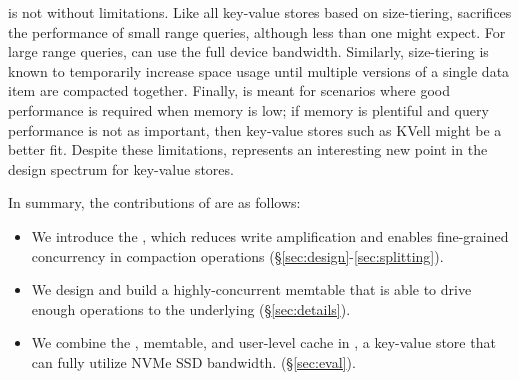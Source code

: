 %

\sysname is not without limitations. Like all key-value stores based
on size-tiering, \sysname sacrifices the performance of small range
queries, although less than one might expect.  For large range
queries, \sysname can use the full device bandwidth. Similarly,
size-tiering is known to temporarily increase space usage until
multiple versions of a single data item are compacted
together. Finally, \sysname is meant for scenarios where good
performance is required when memory is low; if memory is plentiful
and query performance is not as important,
then key-value stores such as KVell might be a better fit. Despite
these limitations, \sysname represents an interesting new point in the
design spectrum for key-value stores.

In summary, the contributions of \sysname are as follows:
\begin{itemize}
\item We introduce the \datastruct, which reduces write amplification and
enables fine-grained concurrency in compaction operations (\S\ref{sec:design}-\ref{sec:splitting}).

\item We design and build a highly-concurrent memtable that is able to
drive enough operations to the underlying \datastruct (\S\ref{sec:details}).

\item We combine the \datastruct, memtable, and user-level cache in \sysname, 
a key-value store that can fully utilize NVMe SSD bandwidth. (\S\ref{sec:eval}).
\end{itemize}
